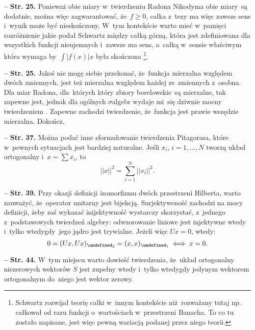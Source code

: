 \documentclass[a4paper,11pt]{article}
\newcommand{\ld}{\ldots}
\newcommand{\mc}{\mathcal}
\newcommand{\wtw}{wtedy i~tylko wtedy}
\newcommand{\si}{\sigma}
\let\H\undefined
\newcommand{\H}{\mc{H}}
\newcommand{\Sum}{\sum\limits}
\newcommand{\Int}{\int\limits}
\newcommand{\norm}[1]{\left|\left| #1 \right|\right|}
\newcommand{\tb}{\textbf}
\newcommand{\noi}{\noindent}
\newcommand{\start}{\noi \tb{--} {}}
\newcommand{\Str}[1]{\tb{Str. #1.}}
\newcommand{\Dok}{{\color{red} Dokończ.}}
\begin{document}
\start \Str{25} Ponieważ obie miary w~twierdzeniu Radona\dywiz
Nikodyma obie
miary~są %
dodatnie, można więc zagwarantować, że~$f \geq
0$,%
całka z~tezy ma więc zawsze sens i~wynik może być nieskończony. W~tym
kontekście warto mieć w~pamięci rozróżnienie jakie podał Schwartz
między całką górną, która jest zdefiniowana dla wszystkich funkcji
nieujemnych i~zawsze ma sens, a~całką w~sensie właściwym która wymaga
by~$\Int{ | f( x ) | }{ x }$ była skończona
\cite{Sch79}\footnote{Schwartz rozwijał teorię całki w~innym
  kontekście niż~rozważany tutaj np. całkował od razu funkcji
  o~wartościach w~przestrzeni Banacha. To co tu zostało napisane, jest
  więc pewną wariacją podanej przez niego teorii.}.

\start \Str{25} Jakoś nie mogę siebie przekonać, że~funkcja mierzalna
względem dwóch zmiennych, jest też mierzalna względem każdej
ze~zmiennych z~osobna. Dla miar Radona, dla~których który
zbiory %
borelowskie~są mierzalne, tak zapewne jest, jednak dla ogólnych
$\si$\dywiz algebr wydaje mi~się dziwnie mocny
twierdzeniem %
. Zapewne zachodzi twierdzenie, że~funkcja jest prawie wszędzie
mierzalna. \Dok

\start \Str{37} Można podać inne sformułowanie twierdzenia Pitagorasa,
które w~pewnych sytuacjach jest bardziej naturalne. Jeśli $x_{ i }$,
$i = 1, \ld, N$ tworzą układ ortogonalny i~$x = \Sum x_{ i }$, to
\begin{displaymath}
  \norm{ x }^{ 2 } = \Sum_{ i = 1 }^{ N } \norm{ x_{ i } }^{ 2 }.
\end{displaymath}

\start \Str{39} Przy okazji definicji izomorfizmu dwóch przestrzeni
Hilberta, warto zauważyć, że~operator unitarny jest bijekcją.
Surjektyweność zachodzi na mocy definicji, żeby zaś wykazać
inijektywność wystarczy skorzystać, z~jednego z~podstawowych twierdzeń
algebry: odwzorowanie liniowe jest injektywne \wtw gdy~jego jądro
jest %
trywialne. Jeżeli więc $Ux = 0$, wtedy:
\begin{displaymath}
  0 = ( Ux, Ux )_{ \H_{ 2 } } = ( x, x )_{ \H_{ 1 } } \iff x = 0.
\end{displaymath}

\start \Str{44} W~tym miejscu warto dowieść twierdzenia, że~układ
ortogonalny niezerowych wektorów $S$ jest zupełny \wtw gdy
jedynym %
wektorem ortogonalnym do~niego jest wektor zerowy.
\end{document}
